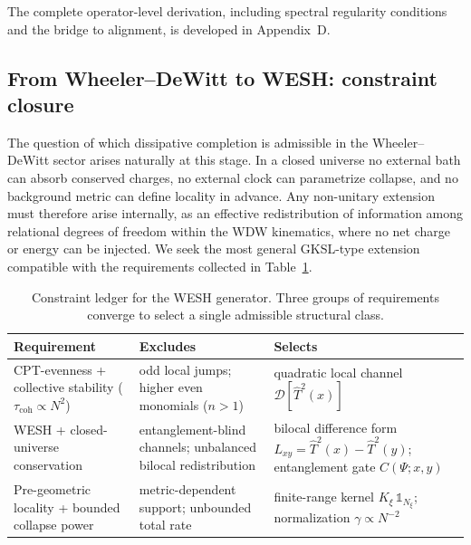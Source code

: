\documentclass[12pt,a4paper]{article}
\numberwithin{equation}{section}
\begin{document}
\vspace{0.3cm}

\noindent The complete operator-level derivation, including spectral regularity 
conditions and the bridge to alignment, is developed in Appendix~D.

\vspace{0.8cm}

\subsection{From Wheeler--DeWitt to WESH: constraint closure}
\label{sec:constraint-closure}

\vspace{0.3cm}

The question of which dissipative completion is admissible in the Wheeler--DeWitt sector arises naturally at this stage. In a closed universe no external bath can absorb conserved charges, no external clock can parametrize collapse, and no background metric can define locality in advance. Any non-unitary extension must therefore arise internally, as an effective redistribution of information among relational degrees of freedom within the WDW kinematics, where no net charge or energy can be injected. We seek the most general GKSL-type extension compatible with the requirements collected in Table~\ref{tab:constraint-ledger}.

\begin{table}[h]
\centering
\small
\renewcommand{\arraystretch}{1.25}
\begin{tabular}{p{3.5cm}|p{4.5cm}|p{4.6cm}}
\toprule
\textbf{Requirement} & \textbf{Excludes} & \textbf{Selects} \\
\midrule
CPT-evenness + \newline collective stability \newline ($\tau_{\mathrm{coh}} \propto N^2$) & odd local jumps; \newline higher even monomials ($n > 1$) & quadratic local channel $\mathcal{D}[\hat T^2(x)]$ \\
\hline
WESH + \newline closed-universe \newline conservation & entanglement-blind channels; \newline unbalanced bilocal redistribution & bilocal difference form \newline $L_{xy} = \hat T^2(x) - \hat T^2(y)$; \newline entanglement gate $C(\Psi;x,y)$ \\
\hline
Pre-geometric locality \newline + bounded collapse power & metric-dependent support; \newline unbounded total rate & finite-range kernel $K_\xi\,\mathbb{1}_{N_\xi}$; \newline normalization $\gamma \propto N^{-2}$ \\
\bottomrule
\end{tabular}
\caption{Constraint ledger for the WESH generator. Three groups of requirements converge to select a single admissible structural class.}
\label{tab:constraint-ledger}
\end{table}
\end{document}
